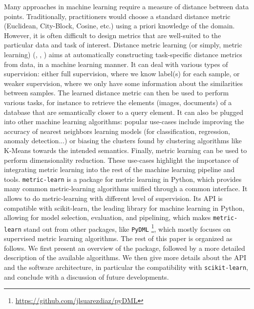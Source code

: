 \documentclass[twoside,11pt]{article}
\begin{document}
Many approaches in machine learning require a measure of distance between data
points. Traditionally, practitioners would choose a standard distance metric
(Euclidean, City-Block, Cosine, etc.) using a priori knowledge of the
domain. However, it is often difficult to design metrics that are well-suited
to the particular data and task of interest.
Distance metric learning  (or simply, metric learning) (\cite{Bellet13}, \cite{Kulis13}, \cite{Surez18}) aims at
automatically constructing task-specific distance metrics from data, in a machine learning manner. It can deal with various types of supervision: either full supervision, where we know label(s) for each sample, or weaker supervision, where we only have some information about the similarities between samples. The learned distance metric can
then be used to perform various tasks, for instance to retrieve the elements (images, documents) of a database that are semantically closer to a query element. It can also be plugged into other machine learning algorithms: popular use-cases include improving the accuracy of nearest neighbors learning models (for classification, regression, anomaly detection...) or biasing the clusters found by clustering algorithms like K-Means towards the intended semantics. Finally, metric learning can be used to perform dimensionality reduction.
These use-cases highlight the importance of integrating metric learning into the rest of the machine learning pipeline and tools.
\texttt{metric-learn} is a package for metric learning in Python, which provides many common metric-learning algorithms unified through a common interface. It allows to do metric-learning with different level of supervision.
Its API is compatible with scikit-learn, the leading library for machine learning in Python, allowing for model selection, evaluation, and pipelining, which makes \texttt{metric-learn} stand out from other packages, like \texttt{PyDML} \footnote{\url{https://github.com/jlsuarezdiaz/pyDML}}, which mostly focuses on supervised metric learning algorithms.
The rest of this paper is organized as follows. We first present an overview of the package, followed by a more detailed description of the available algorithms. We then give more details about the API and the software architecture, in particular the compatibility with \texttt{scikit-learn}, and conclude with a discussion of future developments.
\end{document}
